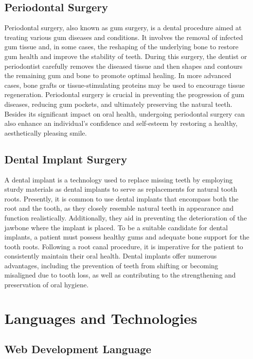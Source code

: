 \documentclass[12pt,oneside,openright,a4paper]{cpe-english-project}
\begin{document}
  \subsection{Periodontal Surgery}
    \qquad Periodontal surgery, also known as gum surgery, is a dental procedure aimed at treating various gum diseases and conditions. It involves the removal of infected gum tissue and, in some cases, the reshaping of the underlying bone to restore gum health and improve the stability of teeth. During this surgery, the dentist or periodontist carefully removes the diseased tissue and then shapes and contours the remaining gum and bone to promote optimal healing. In more advanced cases, bone grafts or tissue-stimulating proteins may be used to encourage tissue regeneration. Periodontal surgery is crucial in preventing the progression of gum diseases, reducing gum pockets, and ultimately preserving the natural teeth. Besides its significant impact on oral health, undergoing periodontal surgery can also enhance an individual's confidence and self-esteem by restoring a healthy, aesthetically pleasing smile.\par

  \subsection{Dental Implant Surgery}
    \qquad A dental implant is a technology used to replace missing teeth by employing sturdy materials as dental implants to serve as replacements for natural tooth roots. Presently, it is common to use dental implants that encompass both the root and the tooth, as they closely resemble natural teeth in appearance and function realistically. Additionally, they aid in preventing the deterioration of the jawbone where the implant is placed. To be a suitable candidate for dental implants, a patient must possess healthy gums and adequate bone support for the tooth roots. Following a root canal procedure, it is imperative for the patient to consistently maintain their oral health. Dental implants offer numerous advantages, including the prevention of teeth from shifting or becoming misaligned due to tooth loss, as well as contributing to the strengthening and preservation of oral hygiene.\par

\section{Languages and Technologies}
  \subsection{Web Development Language}
\end{document}
